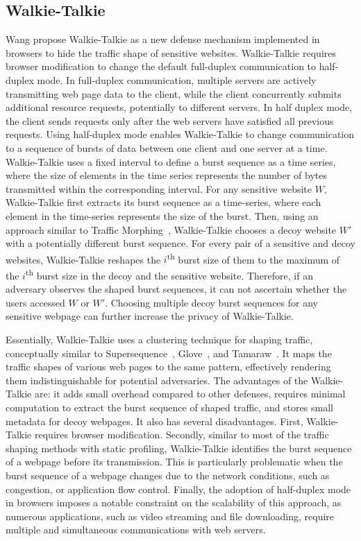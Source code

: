 \subsection{Walkie-Talkie}\label{subsubsec:walkie-talkie}
Wang propose {Walkie-Talkie} as a new defense mechanism implemented in browsers to hide the traffic shape of sensitive websites.
{Walkie-Talkie} requires browser modification to change the default full-duplex communication to half-duplex mode.
In full-duplex communication, multiple servers are actively transmitting web page data to the client, while the client concurrently submits additional resource requests, potentially to different servers.
In half duplex mode, the client sends requests only after the web servers have satisfied all previous requests.
Using half-duplex mode enables {Walkie-Talkie} to change communication to a sequence of bursts of data between one client and one server at a time.
Walkie-Talkie uses a fixed interval to define a burst sequence as a time series, where the size of elements in the time series represents the number of bytes transmitted within the corresponding interval.
For any sensitive website $W$, {Walkie-Talkie} first extracts its burst sequence as a time-series, where each element in the time-series represents the size of the burst.  
Then, using an approach similar to Traffic Morphing~\cite{wright2009traffic}, {Walkie-Talkie} chooses a decoy website $W'$ with a potentially different burst sequence.
For every pair of a sensitive and decoy websites, Walkie-Talkie reshapes the $i$\textsuperscript{th} burst size of them to the maximum of the $i$\textsuperscript{th} burst size in the decoy and the sensitive website. 
Therefore, if an adversary observes the shaped burst sequences, it can not ascertain whether the users accessed $W$ or $W'$.  
Choosing multiple decoy burst sequences for any sensitive webpage can further increase the privacy of {Walkie-Talkie}.

Essentially, {Walkie-Talkie} uses a clustering technique for shaping traffic, conceptually similar to Supersequence~\cite{wang2014supersequence}, Glove~\cite{nithyanand2014glove}, and Tamaraw~\cite{cai2014systematic}.
It maps the traffic shapes of various web pages to the same pattern, effectively rendering them indistinguishable for potential adversaries.
The advantages of the {Walkie-Talkie} are: it adds small overhead compared to other defenses, requires minimal computation to extract the burst sequence of shaped traffic, and stores small metadata for decoy webpages.
It also has several disadvantages. 
First, {Walkie-Talkie} requires browser modification.  
Secondly, similar to most of the traffic shaping methods with static profiling, {Walkie-Talkie} identifies the burst sequence of a webpage before its transmission. 
This is particularly problematic when the burst sequence of a webpage changes due to the network conditions, such as congestion, or application flow control.  
Finally, the adoption of half-duplex mode in browsers imposes a notable constraint on the scalability of this approach, as numerous applications, such as video streaming and file downloading, require multiple and simultaneous communications with web servers.


